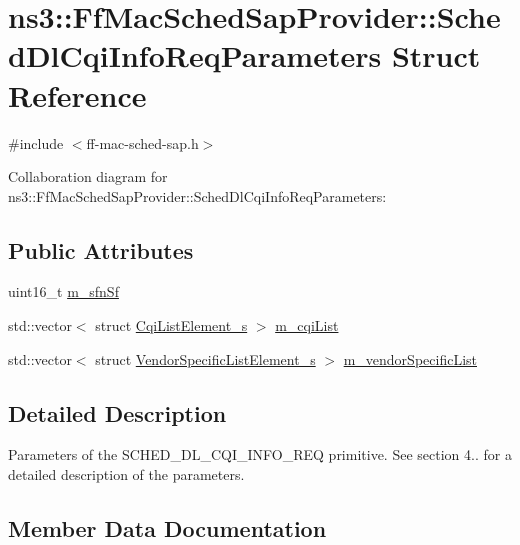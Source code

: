 \hypertarget{structns3_1_1FfMacSchedSapProvider_1_1SchedDlCqiInfoReqParameters}{}\section{ns3\+:\+:Ff\+Mac\+Sched\+Sap\+Provider\+:\+:Sched\+Dl\+Cqi\+Info\+Req\+Parameters Struct Reference}
\label{structns3_1_1FfMacSchedSapProvider_1_1SchedDlCqiInfoReqParameters}


{\ttfamily \#include $<$ff-\/mac-\/sched-\/sap.\+h$>$}



Collaboration diagram for ns3\+:\+:Ff\+Mac\+Sched\+Sap\+Provider\+:\+:Sched\+Dl\+Cqi\+Info\+Req\+Parameters\+:
\subsection*{Public Attributes}
\begin{DoxyCompactItemize}
\item 
uint16\+\_\+t \hyperlink{structns3_1_1FfMacSchedSapProvider_1_1SchedDlCqiInfoReqParameters_ab3e920b00fef256c039da9a45b16bb4a}{m\+\_\+sfn\+Sf}
\item 
std\+::vector$<$ struct \hyperlink{structns3_1_1CqiListElement__s}{Cqi\+List\+Element\+\_\+s} $>$ \hyperlink{structns3_1_1FfMacSchedSapProvider_1_1SchedDlCqiInfoReqParameters_a6f675261f1775ecb5137468be95c0b01}{m\+\_\+cqi\+List}
\item 
std\+::vector$<$ struct \hyperlink{structns3_1_1VendorSpecificListElement__s}{Vendor\+Specific\+List\+Element\+\_\+s} $>$ \hyperlink{structns3_1_1FfMacSchedSapProvider_1_1SchedDlCqiInfoReqParameters_a8b5f3037c90dc41ffaa634c897d84d13}{m\+\_\+vendor\+Specific\+List}
\end{DoxyCompactItemize}


\subsection{Detailed Description}
Parameters of the S\+C\+H\+E\+D\+\_\+\+D\+L\+\_\+\+C\+Q\+I\+\_\+\+I\+N\+F\+O\+\_\+\+R\+EQ primitive. See section 4.. for a detailed description of the parameters. 

\subsection{Member Data Documentation}
